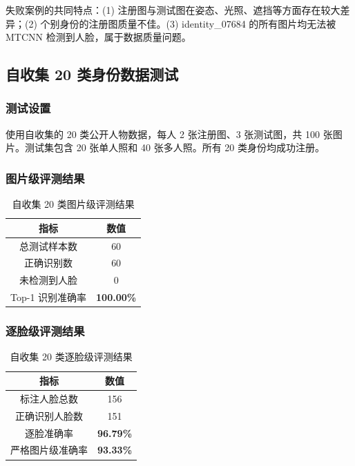 \documentclass[12pt, a4paper]{article}
\begin{document}
失败案例的共同特点：(1) 注册图与测试图在姿态、光照、遮挡等方面存在较大差异；(2) 个别身份的注册图质量不佳。(3) identity\_07684 的所有图片均无法被 MTCNN 检测到人脸，属于数据质量问题。

\subsection{自收集 20 类身份数据测试}

\subsubsection{测试设置}

使用自收集的 20 类公开人物数据，每人 2 张注册图、3 张测试图，共 100 张图片。测试集包含 20 张单人照和 40 张多人照。所有 20 类身份均成功注册。

\subsubsection{图片级评测结果}

\begin{table}[H]
\centering
\caption{自收集 20 类图片级评测结果}
\label{tab:custom-img-result}
\begin{tabular}{cc}
\toprule
指标 & 数值 \\
\midrule
总测试样本数 & 60 \\
正确识别数 & 60 \\
未检测到人脸 & 0 \\
Top-1 识别准确率 & \textbf{100.00\%} \\
\bottomrule
\end{tabular}
\end{table}

\subsubsection{逐脸级评测结果}

\begin{table}[H]
\centering
\caption{自收集 20 类逐脸级评测结果}
\label{tab:custom-face-result}
\begin{tabular}{cc}
\toprule
指标 & 数值 \\
\midrule
标注人脸总数 & 156 \\
正确识别人脸数 & 151 \\
逐脸准确率 & \textbf{96.79\%} \\
严格图片级准确率 & \textbf{93.33\%} \\
\bottomrule
\end{tabular}
\end{table}
\end{document}
